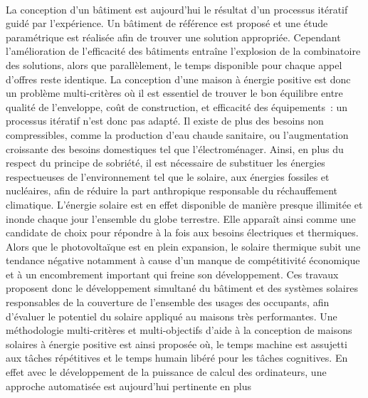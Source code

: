 \paragraph{} %
La conception d’un bâtiment est aujourd’hui le résultat d’un processus itératif guidé par
l’expérience. Un bâtiment de référence est proposé et une étude paramétrique est réalisée
afin de trouver une solution appropriée. Cependant l’amélioration de l’efficacité des
bâtiments entraîne l’explosion de la combinatoire des solutions, alors que parallèlement,
le temps disponible pour chaque appel d’offres reste identique. La conception d’une
maison à énergie positive est donc un problème multi-critères où il est essentiel de
trouver le bon équilibre entre qualité de l’enveloppe, coût de construction, et efficacité
des équipements~: un processus itératif n’est donc pas adapté. Il existe de plus des
besoins non compressibles, comme la production d’eau chaude sanitaire, ou l’augmentation
croissante des besoins domestiques tel que l’électroménager. Ainsi, en plus du respect du
principe de sobriété, il est nécessaire de substituer les énergies respectueuses de
l’environnement tel que le solaire, aux énergies fossiles et nucléaires, afin de réduire la
part anthropique responsable du réchauffement climatique. L’énergie solaire est en effet
disponible de manière presque illimitée et inonde chaque jour l’ensemble du globe
terrestre. Elle apparaît ainsi comme une candidate de choix pour répondre à la fois aux
besoins électriques et thermiques. Alors que le photovoltaïque est en plein expansion, le
solaire thermique subit une tendance négative notamment à cause d’un manque de
compétitivité économique et à un encombrement important qui freine son développement. Ces
travaux proposent donc le développement simultané du bâtiment et des systèmes solaires
responsables de la couverture de l’ensemble des usages des occupants, afin d’évaluer
le potentiel du solaire appliqué au maisons très performantes.
Une méthodologie multi-critères
et multi-objectifs d’aide à la conception de maisons solaires à énergie positive est
ainsi proposée où, le temps machine est assujetti aux tâches répétitives et le temps humain
libéré pour les tâches cognitives. En effet avec le développement de la puissance de
calcul des ordinateurs, une approche automatisée est aujourd’hui pertinente en plus
